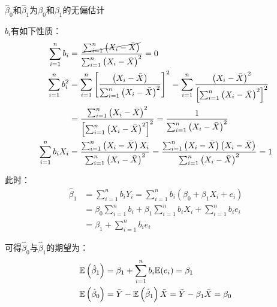 \documentclass[11pt]{article}
\begin{document}
\begin{property}
    $\hat{\beta}_0$和$\hat{\beta}_1$为$\beta_0$和$\beta_1$的无偏估计

    $b_i$有如下性质：
    \begin{align*}
        \sum_{i=1}^{n} b_i
        &= \frac{\cancel{\sum_{i=1}^{n} \left(X_i - \bar{X}\right)}}{\sum_{i=1}^{n} \left(X_i - \bar{X}\right)^2} = 0 \\
        \sum_{i=1}^{n} b_i^2 
        &= \sum_{i=1}^{n} \left[ \frac{\left(X_i - \bar{X}\right)}{\sum_{i=1}^{n} \left(X_i - \bar{X}\right)^2} \right]^2
        = \sum_{i=1}^{n} \frac{\left(X_i - \bar{X}\right)^2}{ \left[ \sum_{i=1}^{n} \left(X_i - \bar{X}\right)^2 \right]^2} \\
        &= \frac{ \sum_{i=1}^{n} \left(X_i - \bar{X}\right)^2}{ \left[ \sum_{i=1}^{n} \left(X_i - \bar{X}\right)^2 \right]^2}
        = \frac{1}{\sum_{i=1}^{n} \left(X_i - \bar{X}\right)^2} \\
        \sum_{i=1}^{n} b_i X_i
        &= \frac{\sum_{i=1}^{n} \left(X_i - \bar{X}\right)X_i}{\sum_{i=1}^{n} \left(X_i - \bar{X}\right)^2}
        = \frac{\sum_{i=1}^{n} \left(X_i - \bar{X}\right) \left( X_i - \bar{X}\right)}{\sum_{i=1}^{n} \left(X_i - \bar{X}\right)^2} = 1
    \end{align*}

    此时：
    \begin{align*}
        \hat{\beta}_1
        &= \sum_{i=1}^{n} b_i Y_i 
        = \sum_{i=1}^{n} b_i \left( \beta_0 + \beta_1 X_i + e_i \right) \\
        &=  \beta_0 \sum_{i=1}^{n} b_i + \beta_1 \sum_{i=1}^{n} b_i X_i + \sum_{i=1}^{n} b_i e_i \\
        &= \beta_1 + \sum_{i=1}^{n} b_i e_i
    \end{align*}

    可得$\hat{\beta}_0$与$\hat{\beta}_1$的期望为：
    \begin{align*}
        \mathbb{E}\left( \hat{\beta}_1 \right)
        &= \beta_1 + \sum_{i=1}^{n} b_i \mathbb{E}(e_i) = \beta_1 \\
        \mathbb{E}\left(\hat{\beta}_0 \right)
        &= \bar{Y} - \mathbb{E}\left( \hat{\beta}_1 \right) \bar{X}
        = \bar{Y} - \beta_1 \bar{X} = \beta_0
    \end{align*}
\end{property}
\end{document}
